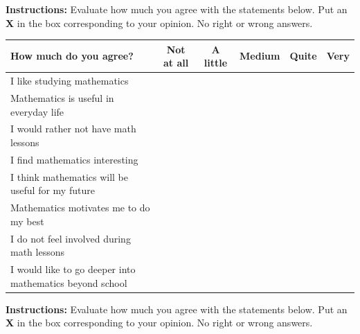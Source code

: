 \newpage

\noindent\textbf{Instructions:} Evaluate how much you agree with the statements below. Put an \textbf{X} in the box corresponding to your opinion. No right or wrong answers.
\newline
\noindent
\begin{tabularx}{\textwidth}{|X|c|c|c|c|c|}
  \hline
  \textbf{How much do you agree?} & \textbf{\scriptsize Not at all} & \textbf{\scriptsize A little} & \textbf{\scriptsize Medium} & \textbf{\scriptsize Quite} & \textbf{\scriptsize Very} \\
  \hline
  I like studying mathematics & & & & & \\
  \hline
  Mathematics is useful in everyday life & & & & & \\
  \hline
  I would rather not have math lessons & & & & & \\
  \hline
  I find mathematics interesting & & & & & \\
  \hline
  I think mathematics will be useful for my future & & & & & \\
  \hline
  Mathematics motivates me to do my best & & & & & \\
  \hline 
  I do not feel involved during math lessons & & & & & \\
  \hline
  I would like to go deeper into mathematics beyond school & & & & & \\
  \hline
\end{tabularx}
\vspace{1cm}
\newline
\noindent\textbf{Instructions:} Evaluate how much you agree with the statements below. Put an \textbf{X} in the box corresponding to your opinion. No right or wrong answers.
\newline

